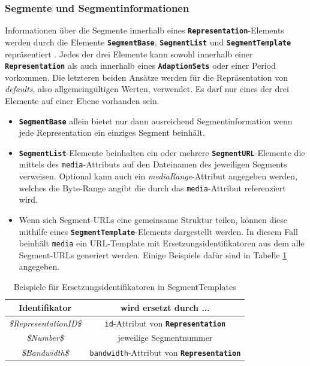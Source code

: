 \documentclass[paper = a4, fontsize = 12pt, parskip = half]{scrartcl} %
\def\attr#1{\texttt{#1}}
\def\elem#1{\texttt{\textbf{#1}}}
\begin{document}
\subsubsection{Segmente und Segmentinformationen}
Informationen über die Segmente innerhalb eines \elem{Representation}-Elements werden durch die Elemente \elem{SegmentBase}, \elem{SegmentList} und \elem{SegmentTemplate} repräsentiert \cite{international_organization_for_standardization_isoiec_nodate}. Jedes der drei Elemente kann sowohl innerhalb einer \elem{Representation} als auch innerhalb eines \elem{AdaptionSets} oder einer Period vorkommen. Die letzteren beiden Ansätze werden für die Repräsentation von \textit{defaults}, also allgemeingültigen Werten, verwendet. Es darf nur eines der drei Elemente auf einer Ebene vorhanden sein.

\begin{itemize}
	\item \elem{SegmentBase} allein bietet nur dann ausreichend Segmentinformation wenn jede Representation ein einziges Segment beinhält.
	\item \elem{SegmentList}-Elemente beinhalten ein oder mehrere \elem{SegmentURL}-Elemente die mittels des \attr{media}-Attributs auf den Dateinamen des jeweiligen Segments verweisen. Optional kann auch ein \textit{mediaRange}-Attribut angegeben werden, welches die Byte-Range angibt die durch das \attr{media}-Attribut referenziert wird.
	\item Wenn sich Segment-URLs eine gemeinsame Struktur teilen, können diese mithilfe eines \elem{SegmentTemplate}-Elements dargestellt werden. In diesem Fall beinhält \attr{media} ein URL-Template mit Ersetzungsidentifikatoren aus dem alle Segment-URLs generiert werden. Einige Beispiele dafür sind in Tabelle \ref{template_substitutions} angegeben. 
\end{itemize}

\begin{center}
	\begin{table}[ht]
        \centering
		\label{template_substitutions}
		\begin{tabular}{| c | c |}
			\hline
			\textbf{Identifikator}        & \textbf{wird ersetzt durch ...}                     \\
			\hline
			\hline
			\textit{\$RepresentationID\$} & \attr{id}-Attribut von \elem{Representation}        \\
			\hline
			\textit{\$Number\$}           & jeweilige Segmentnummer                             \\
			\hline
			\textit{\$Bandwidth\$}        & \attr{bandwidth}-Attribut von \elem{Representation} \\
			\hline
		\end{tabular}
        \caption{Beispiele für Ersetzungsidentifikatoren in SegmentTemplates}
	\end{table}
\end{center}
\end{document}
